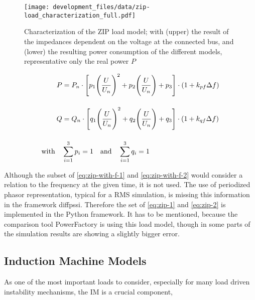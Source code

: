 \begin{figure}[htb!]
        \centering
        \texttt{[image: development\_files/data/zip-load\_characterization\_full.pdf]}
        \caption[Characterization of the ZIP load model]{Characterization of the ZIP load model; with (upper) the result of the impedances dependent on the voltage at the connected bus, and (lower) the resulting power consumption of the different models, representative only the real power $P$}
        \label{fig:zip-charac}
\end{figure}


\begin{align}
        P&=P_n \cdot \Bigg[ p_1 \Bigg(\frac{U}{U_n}\Bigg)^2 + p_2 \Bigg(\frac{U}{U_n}\Bigg) + p_3 \Bigg] \cdot (1+k_{pf} \Delta f) \label{eq:zip-with-f-1} \\[12pt]
        Q&=Q_n \cdot \Bigg[ q_1 \Bigg(\frac{U}{U_n}\Bigg)^2 + q_2 \Bigg(\frac{U}{U_n}\Bigg) + q_3 \Bigg] \cdot (1+k_{qf} \Delta f) \label{eq:zip-with-f-2} \\[12pt]
        \text{with} \quad &\sum_{i=1}^{3} p_i =1 \quad \text{and} \quad \sum_{i=1}^{3} q_i =1 \notag
\end{align}

Although the subset of \autoref{eq:zip-with-f-1} and \autoref{eq:zip-with-f-2} would consider a relation to the frequency at the given time, it is not used. The use of periodized phasor representation, typical for a \acs{RMS} simulation, is missing this information in the framework diffpssi. Therefore the set of \autoref{eq:zip-1} and \autoref{eq:zip-2} is implemented in the Python framework. It has to be mentioned, because the comparison tool PowerFactory is using this load model, though in some parts of the simulation results are showing a slightly bigger error.

\subsection{Induction Machine Models}

As one of the most important loads to consider, especially for many load driven instability mechanisms, the \ac{IM} is a crucial component, \quelle


